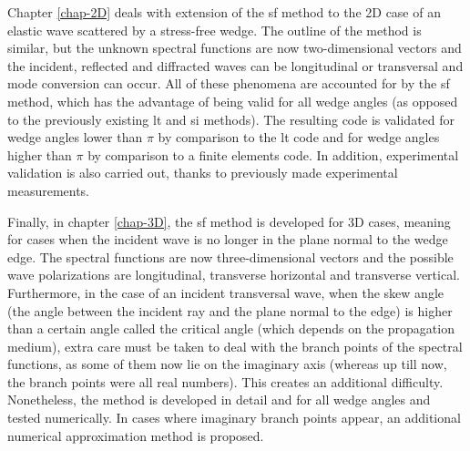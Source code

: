 Chapter \ref{chap-2D} deals with extension of the \acrlong{sf} method to the 2D case of an elastic wave scattered by a stress-free wedge. The outline of the method is similar, but the unknown spectral functions are now two-dimensional vectors and the incident, reflected and diffracted waves can be longitudinal or transversal and mode conversion can occur. All of these phenomena are accounted for by the \acrlong{sf} method, which has the advantage of being valid for all wedge angles (as opposed to the previously existing \acrfull{lt} and \acrfull{si} methods). The resulting code is validated for wedge angles lower than $\pi$ by comparison to the \acrshort{lt} code and for wedge angles higher than $\pi$ by comparison to a finite elements code. In addition, experimental validation is also carried out, thanks to previously made experimental measurements.

Finally, in chapter \ref{chap-3D}, the \acrlong{sf} method is developed for 3D cases, meaning for cases when the incident wave is no longer in the plane normal to the wedge edge. The spectral functions are now three-dimensional vectors and the possible wave polarizations are longitudinal, transverse horizontal and transverse vertical. Furthermore, in the case of an incident transversal wave, when the skew angle (the angle between the incident ray and the plane normal to the edge) is higher than a certain angle called the critical angle (which depends on the propagation medium), extra care must be taken to deal with the branch points of the spectral functions, as some of them now lie on the imaginary axis (whereas up till now, the branch points were all real numbers). This creates an additional difficulty. Nonetheless, the method is developed in detail and for all wedge angles and tested numerically. In cases where imaginary branch points appear, an additional numerical approximation method is proposed.